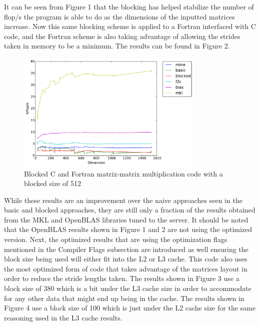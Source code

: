 \documentclass{article}
\begin{document}
\noindent It can be seen from Figure 1 that the blocking has helped stabilize the number of flop/s the program is able to do as the dimensions of the inputted matrices increase. Now this same blocking scheme is applied to a Fortran interfaced with C code, and the Fortran scheme is also taking advantage of allowing the strides taken in memory to be a minimum. The results can be found in Figure 2.

\begin{figure}[H]
  \centering
    \includegraphics[width=0.8\textwidth]{c_f_blocked_no_opt_flags}
    \caption{Blocked C and Fortran matrix-matrix multiplication code with a blocked size of 512}
\end{figure}

\noindent While these results are an improvement over the naive approaches seen in the basic and blocked approaches, they are still only a fraction of the results obtained from the MKL and OpenBLAS libraries tuned to the server. It should be noted that the OpenBLAS results shown in Figure 1 and 2 are not using the optimized version.  Next, the optimized results that are using the optimization flags mentioned in the Compiler Flags subsection are introduced as well ensuring the block size being used will either fit into the L2 or L3 cache. This code also uses the most optimized form of code that takes advantage of the matrices layout in order to reduce the stride lengths taken. The results shown in Figure 3 use a block size of 380 which is a bit under the L3 cache size in order to accommodate for any other data that might end up being in the cache. The results shown in Figure 4 use a block size of 100 which is just under the L2 cache size for the same reasoning used in the L3 cache results. 
\end{document}
